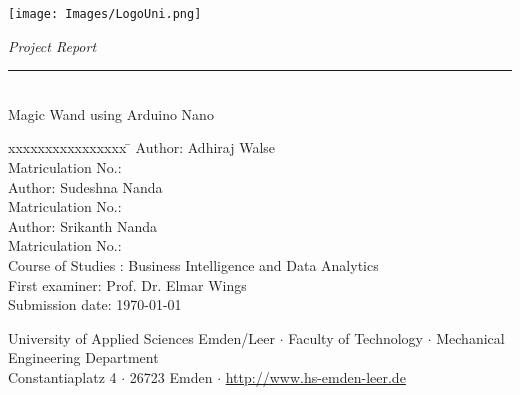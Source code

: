 %
%

\begin{titlepage}
	
	\begin{flushleft} 
		\texttt{[image: Images/LogoUni.png]}
	\end{flushleft} 
	
	\begin{flushright}
		\vspace{2cm}
		\LARGE \textsl{Project Report}\\
		\rule{0.6\textwidth}{0.4pt} ~\\
		\vspace{0.5cm}
		\textsf{\huge Magic Wand using Arduino Nano}\\
	\end{flushright}
	
	\vspace{1.5cm}
	\large
	\begin{tabbing}
		xxxxxxxxxxxxxxxx \= \kill
		Author: \> Adhiraj Walse\\
		Matriculation No.:  \\[0.3cm]
		Author:\> Sudeshna Nanda\\
		Matriculation No.: \\[0.3cm]
		Author:\> Srikanth Nanda\\
		Matriculation No.: \\[0.3cm]
		Course of Studies : \> Business Intelligence and Data Analytics \\ [0.5cm]
		First examiner: \> Prof. Dr. Elmar Wings \\
		Submission date: \> \today \\
	\end{tabbing}
	
	\vspace{3cm}
	\large
	\begin{center}
		University of Applied Sciences Emden/Leer $\cdot$ 
		Faculty of Technology $\cdot$ 
		Mechanical Engineering Department \\
		Constantiaplatz 4 $\cdot$ 
		26723 Emden $\cdot$ 
		\url{http://www.hs-emden-leer.de}
	\end{center}
	
\end{titlepage}
